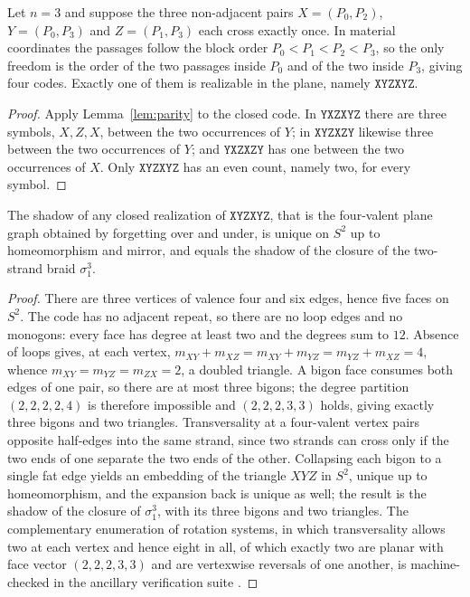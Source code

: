 \begin{lemma}\label{lem:passage}
Let $n=3$ and suppose the three non-adjacent pairs $X=(P_0,P_2)$, $Y=(P_0,P_3)$ and $Z=(P_1,P_3)$ each cross exactly once. In material coordinates the passages follow the block order $P_0<P_1<P_2<P_3$, so the only freedom is the order of the two passages inside $P_0$ and of the two inside $P_3$, giving four codes. Exactly one of them is realizable in the plane, namely $\mathtt{XYZXYZ}$.
\end{lemma}

\begin{proof}
Apply Lemma~\ref{lem:parity} to the closed code. In $\mathtt{YXZXYZ}$ there are three symbols, $X,Z,X$, between the two occurrences of $Y$; in $\mathtt{XYZXZY}$ likewise three between the two occurrences of $Y$; and $\mathtt{YXZXZY}$ has one between the two occurrences of $X$. Only $\mathtt{XYZXYZ}$ has an even count, namely two, for every symbol.
\end{proof}

\begin{lemma}\label{lem:shadow}
The shadow of any closed realization of $\mathtt{XYZXYZ}$, that is the four-valent plane graph obtained by forgetting over and under, is unique on $S^2$ up to homeomorphism and mirror, and equals the shadow of the closure of the two-strand braid $\sigma_1^3$.
\end{lemma}

\begin{proof}
There are three vertices of valence four and six edges, hence five faces on $S^2$. The code has no adjacent repeat, so there are no loop edges and no monogons: every face has degree at least two and the degrees sum to $12$. Absence of loops gives, at each vertex, $m_{XY}+m_{XZ}=m_{XY}+m_{YZ}=m_{YZ}+m_{XZ}=4$, whence $m_{XY}=m_{YZ}=m_{ZX}=2$, a doubled triangle. A bigon face consumes both edges of one pair, so there are at most three bigons; the degree partition $(2,2,2,2,4)$ is therefore impossible and $(2,2,2,3,3)$ holds, giving exactly three bigons and two triangles. Transversality at a four-valent vertex pairs opposite half-edges into the same strand, since two strands can cross only if the two ends of one separate the two ends of the other. Collapsing each bigon to a single fat edge yields an embedding of the triangle $XYZ$ in $S^2$, unique up to homeomorphism, and the expansion back is unique as well; the result is the shadow of the closure of $\sigma_1^3$, with its three bigons and two triangles. The complementary enumeration of rotation systems, in which transversality allows two at each vertex and hence eight in all, of which exactly two are planar with face vector $(2,2,2,3,3)$ and are vertexwise reversals of one another, is machine-checked in the ancillary verification suite \cite{anc}.
\end{proof}

